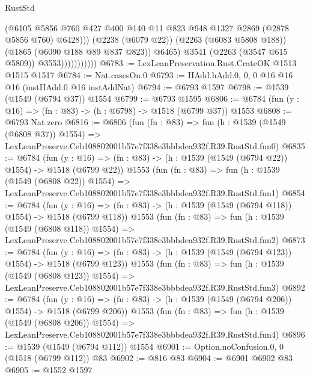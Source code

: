 \begin{lexlean}{RustStd}
\begin{coremodule}
                                (@6105
                                  @5856
                                  @760
                                  @427
                                  @400
                                  @140
                                  @11
                                  @823
                                  @948
                                  @1327
                                  @2869
                                  (@2878 @5856 @760)
                                  @6428)))
                            (@2238 (@6079 @22))
                            (@2263 (@6083 @5808 @188))
                            (@1865 (@6090 @188 @89 @837 @823))
                            @6465)
                          @3541
                          (@2263 (@3547 @615 @5809))
                          @3553)))))))))))
@6783 := LexLeanPreservation.Rust.CrateOK @1513 @1515 @1517
@6784 := Nat.casesOn.{0}
@6793 := HAdd.hAdd.{0, 0, 0} @16 @16 @16 (instHAdd.{0} @16 instAddNat)
@6794 := @6793 @1597
@6798 := @1539 (@1549 (@6794 @37)) @1554
@6799 := @6793 @1595
@6806 := @6784 (fun (y : @16) => (fn : @83) -> (h : @6798) -> @1518 (@6799 @37)) @1553
@6808 := @6793 Nat.zero
@6816 := @6806
    (fun (fn : @83) =>
    fun (h : @1539 (@1549 (@6808 @37)) @1554) =>
    LexLeanPreserve.Ceb108802001b57e7f338e3bbbdea932f.R39.RustStd.fun0)
@6835 := @6784
    (fun (y : @16) => (fn : @83) -> (h : @1539 (@1549 (@6794 @22)) @1554) -> @1518 (@6799 @22))
    @1553
    (fun (fn : @83) =>
    fun (h : @1539 (@1549 (@6808 @22)) @1554) =>
    LexLeanPreserve.Ceb108802001b57e7f338e3bbbdea932f.R39.RustStd.fun1)
@6854 := @6784
    (fun (y : @16) => (fn : @83) -> (h : @1539 (@1549 (@6794 @118)) @1554) -> @1518 (@6799 @118))
    @1553
    (fun (fn : @83) =>
    fun (h : @1539 (@1549 (@6808 @118)) @1554) =>
    LexLeanPreserve.Ceb108802001b57e7f338e3bbbdea932f.R39.RustStd.fun2)
@6873 := @6784
    (fun (y : @16) => (fn : @83) -> (h : @1539 (@1549 (@6794 @123)) @1554) -> @1518 (@6799 @123))
    @1553
    (fun (fn : @83) =>
    fun (h : @1539 (@1549 (@6808 @123)) @1554) =>
    LexLeanPreserve.Ceb108802001b57e7f338e3bbbdea932f.R39.RustStd.fun3)
@6892 := @6784
    (fun (y : @16) => (fn : @83) -> (h : @1539 (@1549 (@6794 @206)) @1554) -> @1518 (@6799 @206))
    @1553
    (fun (fn : @83) =>
    fun (h : @1539 (@1549 (@6808 @206)) @1554) =>
    LexLeanPreserve.Ceb108802001b57e7f338e3bbbdea932f.R39.RustStd.fun4)
@6896 := @1539 (@1549 (@6794 @112)) @1554
@6901 := Option.noConfusion.{0, 0} (@1518 (@6799 @112)) @83
@6902 := @816 @83
@6904 := @6901 @6902 @83
@6905 := @1552 @1597

\end{coremodule}
\end{lexlean}
